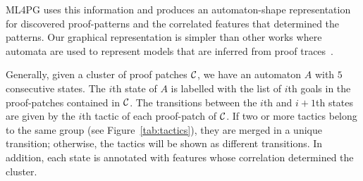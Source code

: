 ML4PG uses this information and produces an automaton-shape representation for discovered %
proof-patterns and the correlated features that determined the patterns. 
Our graphical representation is simpler than other works where automata are used to represent models that are inferred from proof traces~\cite{GWR14}.  


Generally, given a cluster of proof patches ${\cal C}$, we have an automaton $A$ with $5$ consecutive states. The $i$th state of $A$ is labelled
with the list of $i$th goals in the proof-patches contained in ${\cal C}$. The transitions between the $i$th and $i+1$th states are given by 
the $i$th tactic of each proof-patch of ${\cal C}$. If two or more tactics belong to the same group (see Figure~\ref{tab:tactics}),
they are merged in a unique transition; otherwise, the tactics will be shown as different transitions. In addition, each state is annotated with 
features 
whose correlation determined the cluster.


% 


 
 
